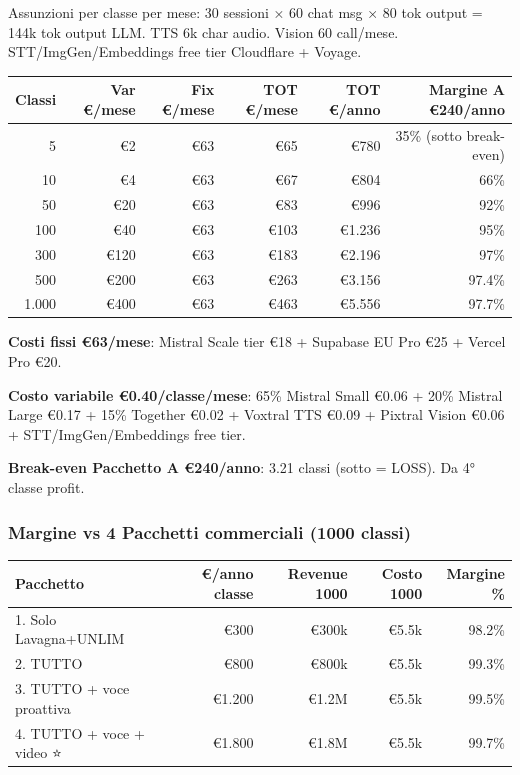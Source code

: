 \documentclass[12pt,a4paper]{article}
\begin{document}
Assunzioni per classe per mese: 30 sessioni × 60 chat msg × 80 tok output = 144k tok output LLM. TTS 6k char audio. Vision 60 call/mese. STT/ImgGen/Embeddings free tier Cloudflare + Voyage.

\begin{center}
\begin{tabular}{rrrrrr}
\toprule
\textbf{Classi} & \textbf{Var €/mese} & \textbf{Fix €/mese} & \textbf{TOT €/mese} & \textbf{TOT €/anno} & \textbf{Margine A €240/anno} \\
\midrule
5     & €2     & €63 & €65   & €780    & 35\% (sotto break-even) \\
10    & €4     & €63 & €67   & €804    & 66\% \\
50    & €20    & €63 & €83   & €996    & 92\% \\
100   & €40    & €63 & €103  & €1.236  & 95\% \\
300   & €120   & €63 & €183  & €2.196  & 97\% \\
500   & €200   & €63 & €263  & €3.156  & 97.4\% \\
1.000 & €400   & €63 & €463  & €5.556  & 97.7\% \\
\bottomrule
\end{tabular}
\end{center}

\textbf{Costi fissi €63/mese}: Mistral Scale tier €18 + Supabase EU Pro €25 + Vercel Pro €20.

\textbf{Costo variabile €0.40/classe/mese}: 65\% Mistral Small €0.06 + 20\% Mistral Large €0.17 + 15\% Together €0.02 + Voxtral TTS €0.09 + Pixtral Vision €0.06 + STT/ImgGen/Embeddings free tier.

\textbf{Break-even Pacchetto A €240/anno}: 3.21 classi (sotto = LOSS). Da 4° classe profit.

\subsubsection*{Margine vs 4 Pacchetti commerciali (1000 classi)}

\begin{center}
\begin{tabular}{lrrrr}
\toprule
\textbf{Pacchetto} & \textbf{€/anno classe} & \textbf{Revenue 1000} & \textbf{Costo 1000} & \textbf{Margine \%} \\
\midrule
1. Solo Lavagna+UNLIM      & €300      & €300k    & €5.5k & 98.2\% \\
2. TUTTO                    & €800      & €800k    & €5.5k & 99.3\% \\
3. TUTTO + voce proattiva   & €1.200    & €1.2M    & €5.5k & 99.5\% \\
4. TUTTO + voce + video ⭐  & €1.800    & €1.8M    & €5.5k & 99.7\% \\
\bottomrule
\end{tabular}
\end{center}
\end{document}
